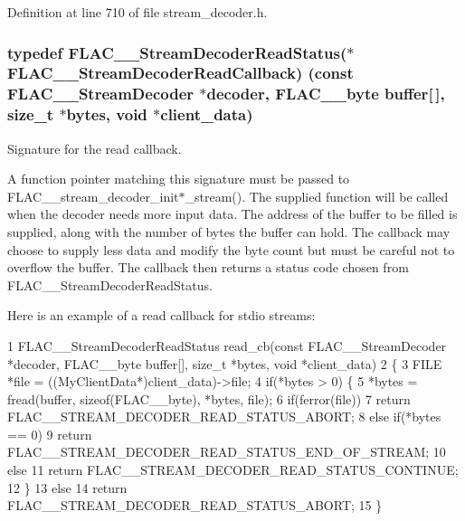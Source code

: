Definition at line 710 of file stream\+\_\+decoder.\+h.

\subsubsection[{\texorpdfstring{F\+L\+A\+C\+\_\+\+\_\+\+Stream\+Decoder\+Read\+Callback}{FLAC__StreamDecoderReadCallback}}]{\setlength{\rightskip}{0pt plus 5cm}typedef {\bf F\+L\+A\+C\+\_\+\+\_\+\+Stream\+Decoder\+Read\+Status}($\ast$ F\+L\+A\+C\+\_\+\+\_\+\+Stream\+Decoder\+Read\+Callback) ({\bf const} {\bf F\+L\+A\+C\+\_\+\+\_\+\+Stream\+Decoder} $\ast$decoder, {\bf F\+L\+A\+C\+\_\+\+\_\+byte} {\bf buffer}\mbox{[}$\,$\mbox{]}, size\+\_\+t $\ast$bytes, {\bf void} $\ast$client\+\_\+data)}\hypertarget{group__flac__stream__decoder_ga25d4321dc2f122d35ddc9061f44beae7}{}\label{group__flac__stream__decoder_ga25d4321dc2f122d35ddc9061f44beae7}
Signature for the read callback.

A function pointer matching this signature must be passed to F\+L\+A\+C\+\_\+\+\_\+stream\+\_\+decoder\+\_\+init$\ast$\+\_\+stream(). The supplied function will be called when the decoder needs more input data. The address of the buffer to be filled is supplied, along with the number of bytes the buffer can hold. The callback may choose to supply less data and modify the byte count but must be careful not to overflow the buffer. The callback then returns a status code chosen from F\+L\+A\+C\+\_\+\+\_\+\+Stream\+Decoder\+Read\+Status.

Here is an example of a read callback for stdio streams\+: 
\begin{DoxyCode}
1 FLAC\_\_StreamDecoderReadStatus read\_cb(const FLAC\_\_StreamDecoder *decoder, FLAC\_\_byte buffer[], size\_t
       *bytes, void *client\_data)
2 \{
3   FILE *file = ((MyClientData*)client\_data)->file;
4   if(*bytes > 0) \{
5     *bytes = fread(buffer, sizeof(FLAC\_\_byte), *bytes, file);
6     if(ferror(file))
7       return FLAC\_\_STREAM\_DECODER\_READ\_STATUS\_ABORT;
8     else if(*bytes == 0)
9       return FLAC\_\_STREAM\_DECODER\_READ\_STATUS\_END\_OF\_STREAM;
10     else
11       return FLAC\_\_STREAM\_DECODER\_READ\_STATUS\_CONTINUE;
12   \}
13   else
14     return FLAC\_\_STREAM\_DECODER\_READ\_STATUS\_ABORT;
15 \}
\end{DoxyCode}


